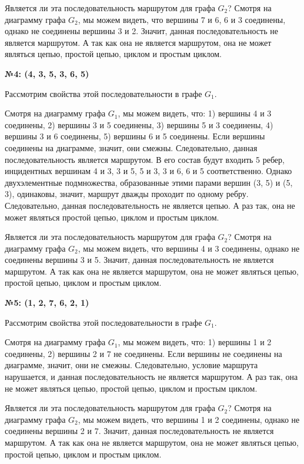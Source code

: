 \documentclass[12pt]{article}
\begin{document}
	Является ли эта последовательность маршрутом для графа $G_2$? Смотря на диаграмму графа $G_2$, мы можем видеть, что вершины 7 и 6, 6 и 3 соединены, однако не соединены вершины 3 и 2. Значит, данная последовательность не является маршрутом. А так как она не является маршрутом, она не может являться цепью, простой цепью, циклом и простым циклом.
	
	{\bf №4: (4, 3, 5, 3, 6, 5)}
	
	Рассмотрим свойства этой последовательности в графе $G_1$.
	
	Смотря на диаграмму графа $G_1$, мы можем видеть, что: 1) вершины 4 и 3 соединены, 2) вершины 3 и 5 соединены, 3) вершины 5 и 3 соединены, 4) вершины 3 и 6 соединены, 5) вершины 6 и 5 соединены. Если вершины соединены на диаграмме, значит, они смежны. Следовательно, данная последовательность является маршрутом. В его состав будут входить 5 ребер, инцидентных вершинам 4 и 3, 3 и 5, 5 и 3, 3 и 6, 6 и 5 соответственно. Однако двухэлементные подмножества, образованные этими парами вершин (3, 5) и (5, 3), одинаковы, значит, маршрут дважды проходит по одному ребру. Следовательно, данная последовательность не является цепью. А раз так, она не может являться простой цепью, циклом и простым циклом.
	
	Является ли эта последовательность маршрутом для графа $G_2$? Смотря на диаграмму графа $G_2$, мы можем видеть, что вершины 4 и 3 соединены, однако не соединены вершины 3 и 5. Значит, данная последовательность не является маршрутом. А так как она не является маршрутом, она не может являться цепью, простой цепью, циклом и простым циклом.
	
	{\bf №5: (1, 2, 7, 6, 2, 1)}
	
	Рассмотрим свойства этой последовательности в графе $G_1$.
	
	Смотря на диаграмму графа $G_1$, мы можем видеть, что: 1) вершины 1 и 2 соединены, 2) вершины 2 и 7 не соединены. Если вершины не соединены на диаграмме, значит, они не смежны. Следовательно, условие маршрута нарушается, и данная последовательность не является маршрутом. А раз так, она не может являться цепью, простой цепью, циклом и простым циклом.
	
	Является ли эта последовательность маршрутом для графа $G_2$? Смотря на диаграмму графа $G_2$, мы можем видеть, что вершины 1 и 2 соединены, однако не соединены вершины 2 и 7. Значит, данная последовательность не является маршрутом. А так как она не является маршрутом, она не может являться цепью, простой цепью, циклом и простым циклом.
	
\end{document}

